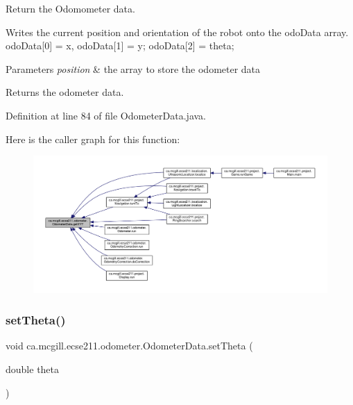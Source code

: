 Return the Odomometer data. 

Writes the current position and orientation of the robot onto the odo\+Data array. odo\+Data\mbox{[}0\mbox{]} = x, odo\+Data\mbox{[}1\mbox{]} = y; odo\+Data\mbox{[}2\mbox{]} = theta;


\begin{DoxyParams}{Parameters}
{\em position} & the array to store the odometer data \\
\hline
\end{DoxyParams}
\begin{DoxyReturn}{Returns}
the odometer data. 
\end{DoxyReturn}


Definition at line 84 of file Odometer\+Data.\+java.

Here is the caller graph for this function\+:
\nopagebreak
\begin{figure}[H]
\begin{center}
\leavevmode
\includegraphics[width=350pt]{classca_1_1mcgill_1_1ecse211_1_1odometer_1_1_odometer_data_a8f40f0264c68f0cbed4fff1723ae7863_icgraph}
\end{center}
\end{figure}
\mbox{\label{classca_1_1mcgill_1_1ecse211_1_1odometer_1_1_odometer_data_a419b8f07c2c5374411c8e62298e9a402}} 
\subsubsection{\texorpdfstring{set\+Theta()}{setTheta()}}
{\footnotesize\ttfamily void ca.\+mcgill.\+ecse211.\+odometer.\+Odometer\+Data.\+set\+Theta (\begin{DoxyParamCaption}\item[{double}]{theta }\end{DoxyParamCaption})}

